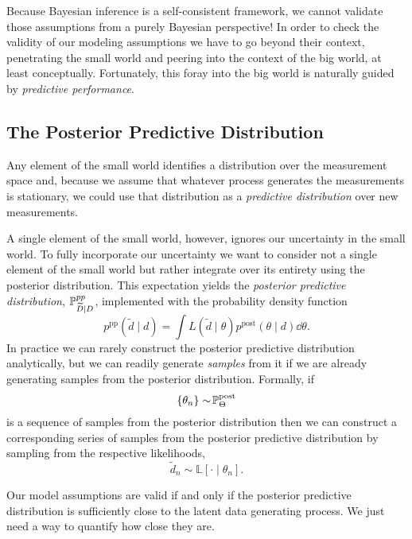 Because Bayesian inference is a self-consistent framework, 
we cannot validate those assumptions from a purely Bayesian 
perspective! In order to check the validity of our modeling 
assumptions we have to go beyond their context, penetrating
the small world and peering into the context of the big world, 
at least conceptually.  Fortunately, this foray into the big world 
is naturally guided by \emph{predictive performance}.

\subsection{The Posterior Predictive Distribution}

Any element of the small world identifies a distribution over the 
measurement space and, because we assume that whatever
process generates the measurements is stationary, we could use 
that distribution as a \emph{predictive distribution} over new 
measurements.

A single element of the small world, however, ignores our
uncertainty in the small world.  To fully incorporate our uncertainty
we want to consider not a single element of the small world
but rather integrate over its entirety using the posterior distribution.
This expectation yields the \emph{posterior predictive distribution},
$\mathbb{P}_{\widetilde{D} \mid D}^{pp}$, implemented with the probability 
density function
%
\begin{equation*}
p^{\mathrm{pp}} \! \left( \tilde{d} \mid d \right)
= \int L \! \left( \tilde{d} \mid \theta \right)
p^{\mathrm{post}} \! \left( \theta \mid d \right)
\dd \theta.
\end{equation*}
%
In practice we can rarely construct the posterior predictive
distribution analytically, but we can readily generate \emph{samples} 
from it if we are already generating samples from the posterior
distribution.  Formally, if
%
\begin{equation*}
\left\{ \theta_{n} \right\} \sim \! \mathbb{P}^{\mathrm{post}}_{\Theta}
\end{equation*}
%
is a sequence of samples from the posterior distribution then
we can construct a corresponding series of samples from the 
posterior predictive distribution by sampling from the respective 
likelihoods,
%
\begin{equation*}
\tilde{d}_{n} \sim \! \mathbb{L} \! \left[ \cdot \mid \theta_{n} \right].
\end{equation*}

Our model assumptions are valid if and only if the posterior
predictive distribution is sufficiently close to the latent data
generating process.  We just need a way to quantify how
close they are.

